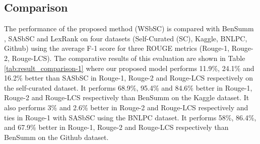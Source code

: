 \documentclass[acmlarge]{acmart}
\begin{document}
\subsection{Comparison}\label{subsec:comparison}
The performance of the proposed method (WSbSC) is compared with BenSumm \cite{chowdhury-etal-2021-tfidf-clustering}, SASbSC \cite{roychowdhury-etal-2022-spectral-base} and LexRank \cite{Erkan-lexRank-2004} on four datasets (Self-Curated (SC), Kaggle, BNLPC, Github) using the average F-1 score for three ROUGE metrics (Rouge-1, Rouge-2, Rouge-LCS). The comparative results of this evaluation are shown in Table \ref{tab:result_comparison-1} where our proposed model performs 11.9\%, 24.1\% and 16.2\% better than SASbSC in Rouge-1, Rouge-2 and Rouge-LCS respectively on the self-curated dataset. It performs 68.9\%, 95.4\% and 84.6\% better in Rouge-1, Rouge-2 and Rouge-LCS respectively than BenSumm on the Kaggle dataset. It also performs 3\% and 2.6\% better in Rouge-2 and Rouge-LCS respectively and ties in Rouge-1 with SASbSC using the BNLPC dataset. It performs 58\%, 86.4\%, and 67.9\% better in Rouge-1, Rouge-2 and Rouge-LCS respectively than BenSumm on the Github dataset.
\end{document}
